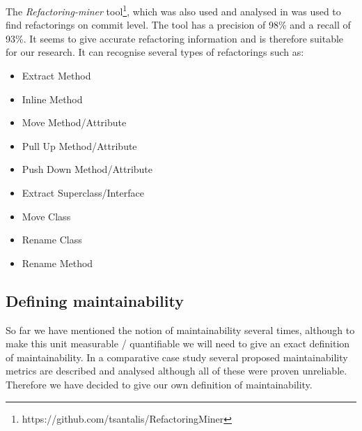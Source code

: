 The \textit{Refactoring-miner} tool\footnote{https://github.com/tsantalis/RefactoringMiner}, which was also used and analysed in \cite{silva2016we} was used to find refactorings on commit level. The tool has a precision of 98\% and a recall of 93\%\cite{silva2016we}. It seems to give accurate refactoring information and is therefore suitable for our research. It can recognise several types of refactorings such as: 
\begin{itemize}
    \item Extract Method
    \item Inline Method
    \item Move Method/Attribute
    \item Pull Up Method/Attribute
    \item Push Down Method/Attribute
    \item Extract Superclass/Interface
    \item Move Class
    \item Rename Class
    \item Rename Method
\end{itemize}


\subsection{Defining maintainability}
So far we have mentioned the notion of maintainability several times, although to make this unit measurable / quantifiable we will need to give an exact definition of maintainability. In a comparative case study \cite{sjoberg2012questioning} several proposed maintainability metrics are described and analysed although all of these were proven unreliable. Therefore we have decided to give our own definition of maintainability.
